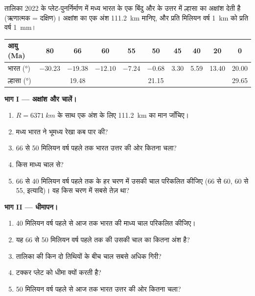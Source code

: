 \begin{problem}[{सप्ताहांत समस्या --- भारत की यात्रा}]
\label{pb:g12:mountain-building:1}
तालिका 2022 के प्लेट-पुनर्निर्माण में मध्य भारत के एक बिंदु और  के उत्तर में
ल्हासा का अक्षांश देती है (ऋणात्मक = दक्षिण)।
अक्षांश का एक अंश \qty{111.2}{km} मानिए, और प्रति मिलियन
वर्ष \qty{1}{km} को प्रति वर्ष \qty{1}{mm}।

\begin{center}
\small
\begin{tabular}{|l|c|c|c|c|c|c|c|c|c|}
\hline
आयु (\unit{Ma}) & 80 & 66 & 60 & 55 & 50 & 45 & 40 & 20 & 0 \\ \hline
भारत (\unit{\degree}) & $-30.23$ & $-19.38$ & $-12.10$ & $-7.24$ & $-0.68$ & 3.30 & 5.59 & 13.40 & 20.00 \\ \hline
ल्हासा (\unit{\degree}) & & 19.48 & & & 21.15 & & & & 29.65 \\ \hline
\end{tabular}
\end{center}

\medskip
\noindent\textbf{भाग I --- अक्षांश और चालें।}
\begin{enumerate}
  \item $R =
        \qty{6371}{km}$ के साथ एक अंश के लिए \qty{111.2}{km} का मान जाँचिए।
  \item मध्य भारत ने भूमध्य रेखा कब पार की?
  \item 66 से 50 मिलियन वर्ष पहले तक भारत उत्तर की ओर कितना चला?
  \item किस माध्य चाल से?
  \item 66 से 40 मिलियन वर्ष पहले तक के हर चरण में उसकी चाल परिकलित कीजिए (66
        से 60, 60 से 55, इत्यादि)। वह किस चरण में सबसे तेज़ था?
\end{enumerate}

\medskip
\noindent\textbf{भाग II --- धीमापन।}
\begin{enumerate}[resume]
  \item 40 मिलियन वर्ष पहले से आज तक भारत की माध्य चाल परिकलित कीजिए।
  \item यह 66 से 50 मिलियन वर्ष पहले तक की उसकी चाल का कितना अंश है?
  \item तालिका की किन दो तिथियों के बीच चाल सबसे अधिक गिरी?
  \item टक्कर प्लेट को धीमा क्यों करती है?
  \item 50 मिलियन वर्ष पहले से आज तक भारत उत्तर की ओर कितना चला?
\end{enumerate}


\end{problem}
